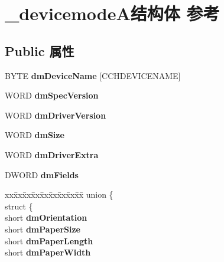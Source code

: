 \hypertarget{struct__devicemode_a}{}\section{\+\_\+devicemode\+A结构体 参考}
\label{struct__devicemode_a}
\subsection*{Public 属性}
\begin{DoxyCompactItemize}
\item 
\mbox{\label{struct__devicemode_a_ae79f1b6894d7914fa1652fb0b45f3740}} 
B\+Y\+TE {\bfseries dm\+Device\+Name} \mbox{[}C\+C\+H\+D\+E\+V\+I\+C\+E\+N\+A\+ME\mbox{]}
\item 
\mbox{\label{struct__devicemode_a_a46561cd9aa391609122bc12555610ec5}} 
W\+O\+RD {\bfseries dm\+Spec\+Version}
\item 
\mbox{\label{struct__devicemode_a_a01b16348ad3ea86e41d45d5691eb222b}} 
W\+O\+RD {\bfseries dm\+Driver\+Version}
\item 
\mbox{\label{struct__devicemode_a_af79eac167b0eaff6cf0c049e2642d632}} 
W\+O\+RD {\bfseries dm\+Size}
\item 
\mbox{\label{struct__devicemode_a_ad8e7cbaceca360c0f97d4d227e41739a}} 
W\+O\+RD {\bfseries dm\+Driver\+Extra}
\item 
\mbox{\label{struct__devicemode_a_a2bf8d9ed674304dbd26a95d304d5b66a}} 
D\+W\+O\+RD {\bfseries dm\+Fields}
\item 
\mbox{\label{struct__devicemode_a_a2a547938b72b1c138b3bb3c5eb3dee0a}} 
\begin{tabbing}
xx\=xx\=xx\=xx\=xx\=xx\=xx\=xx\=xx\=\kill
union \{\\
\>struct \{\\
\>\>short {\bfseries dmOrientation}\\
\>\>short {\bfseries dmPaperSize}\\
\>\>short {\bfseries dmPaperLength}\\
\>\>short {\bfseries dmPaperWidth}\\

\end{tabbing}
\end{DoxyCompactItemize}
